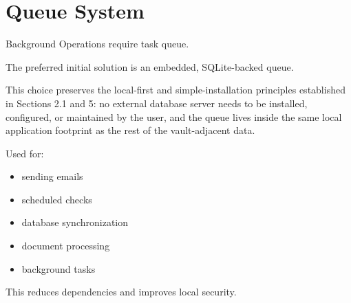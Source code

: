 
\chapter{Queue System}

Background Operations require task queue.

The preferred initial solution is an embedded, SQLite-backed queue.

This choice preserves the local-first and simple-installation principles established in Sections 2.1 and 5: no external database server needs to be installed, configured, or maintained by the user, and the queue lives inside the same local application footprint as the rest of the vault-adjacent data.

Used for:
\begin{itemize}
	\item sending emails
	\item scheduled checks
	\item database synchronization
	\item document processing
	\item background tasks

\end{itemize}
This reduces dependencies and improves local security.


\sentinelchapterend
